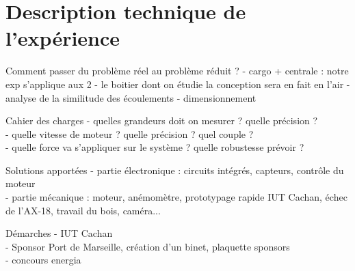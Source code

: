 \documentclass[a4paper,12pt]{article}
\newcounter{partie}
\newcounter{sous-partie}
\newenvironment{partie}[1]
{
\section{#1}
}
{

}
\newenvironment{sous-partie}[1]
{
\subsection{#1}
}
{

}
\begin{document}
\begin{partie}{Description technique de l'expérience}

\begin{sous-partie}{Comment passer du problème réel au problème réduit ?}
- cargo + centrale : notre exp s'applique aux 2
\newline
- le boitier dont on étudie la conception sera en fait en l'air
\newline
- analyse de la similitude des écoulements
\newline
- dimensionnement

\end{sous-partie}

\begin{sous-partie}{Cahier des charges}
- quelles grandeurs doit on mesurer ? quelle précision ?
\\
- quelle vitesse de moteur ? quelle précision ? quel couple ?
\\
- quelle force va s'appliquer sur le système ? quelle robustesse prévoir ?
\end{sous-partie}

\begin{sous-partie}{Solutions apportées}
- partie électronique : circuits intégrés, capteurs, contrôle du moteur
\\
- partie mécanique :  moteur, anémomètre, prototypage rapide IUT Cachan, échec de l'AX-18, travail du bois, caméra...
\end{sous-partie}

\begin{sous-partie}{Démarches}
- IUT Cachan
\\
- Sponsor Port de Marseille, création d'un binet, plaquette sponsors
\\
- concours energia
\end{sous-partie}




\end{partie}

\newpage
\end{document}
